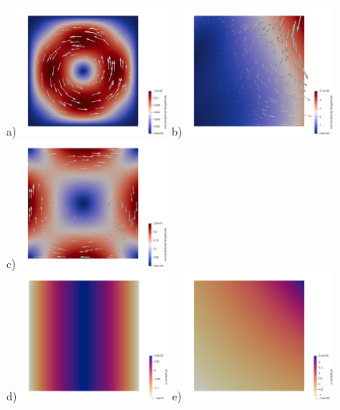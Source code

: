 \documentclass[a4paper,12pt]{article}
\begin{document}
\begin{figure}[t]
\centering
a)\includegraphics[width=5cm]{../images/fields/vel_dh}
b)\includegraphics[width=5cm]{../images/fields/vel_dobo}
c)\includegraphics[width=5cm]{../images/fields/vel_cavity} \\
d)\includegraphics[width=5cm]{../images/fields/press_dh}
e)\includegraphics[width=5cm]{../images/fields/press_dobo}

\end{figure}
\end{document}
